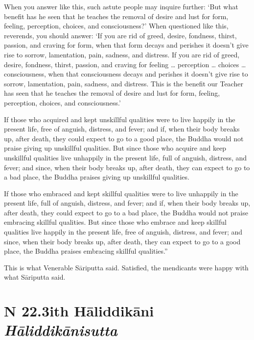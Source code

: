 \documentclass[12pt,openany]{book}%
\newcommand*{\suttatitleacronym}[1]{\smaller[2]{#1}\vspace*{.3em}}
\newcommand*{\suttatitletranslation}[1]{\linebreak{#1}}
\newcommand*{\suttatitleroot}[1]{\linebreak\smaller[2]\itshape{#1}}
\newcommand*{\tocacronym}[1]{\hspace*{-3.3em}{#1}\quad}
\newcommand*{\toctranslation}[1]{#1}
\newcommand*{\tocroot}[1]{(\textit{#1})}
\begin{document}
When you answer like this, such astute people may inquire further: ‘But what benefit has he seen that he teaches the removal of desire and lust for form, feeling, perception, choices, and consciousness?’ When questioned like this, reverends, you should answer: ‘If you are rid of greed, desire, fondness, thirst, passion, and craving for form, when that form decays and perishes it doesn’t give rise to sorrow, lamentation, pain, sadness, and distress. If you are rid of greed, desire, fondness, thirst, passion, and craving for feeling … perception … choices … consciousness, when that consciousness decays and perishes it doesn’t give rise to sorrow, lamentation, pain, sadness, and distress. This is the benefit our Teacher has seen that he teaches the removal of desire and lust for form, feeling, perception, choices, and consciousness.’ 

If those who acquired and kept unskillful qualities were to live happily in the present life, free of anguish, distress, and fever; and if, when their body breaks up, after death, they could expect to go to a good place, the Buddha would not praise giving up unskillful qualities. But since those who acquire and keep unskillful qualities live unhappily in the present life, full of anguish, distress, and fever; and since, when their body breaks up, after death, they can expect to go to a bad place, the Buddha praises giving up unskillful qualities. 

If those who embraced and kept skillful qualities were to live unhappily in the present life, full of anguish, distress, and fever; and if, when their body breaks up, after death, they could expect to go to a bad place, the Buddha would not praise embracing skillful qualities. But since those who embrace and keep skillful qualities live happily in the present life, free of anguish, distress, and fever; and since, when their body breaks up, after death, they can expect to go to a good place, the Buddha praises embracing skillful qualities.” 

This is what Venerable \textsanskrit{Sāriputta} said. Satisfied, the mendicants were happy with what \textsanskrit{Sāriputta} said. 

%
\section*{{\suttatitleacronym SN 22.3}{\suttatitletranslation With Hāliddikāni }{\suttatitleroot Hāliddikānisutta}}
\addcontentsline{toc}{section}{\tocacronym{SN 22.3} \toctranslation{With Hāliddikāni } \tocroot{Hāliddikānisutta}}
\end{document}
